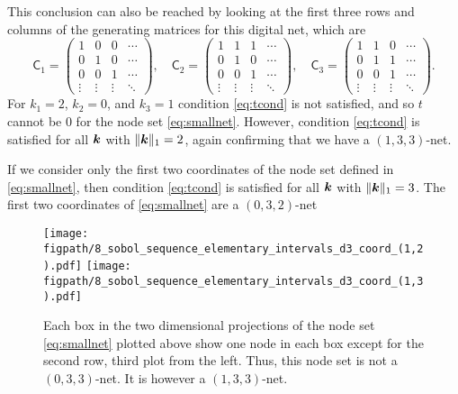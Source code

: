 \documentclass{svproc}
\newcommand{\figpath}{Figures}
\begin{document}
This conclusion can also be reached by looking at the first three rows and columns of the generating matrices for this digital net, which are
\begin{equation*}
	\mathsf{C}_1 = \begin{pmatrix}
		1 & 0 & 0 & \cdots \\ 0 & 1 & 0 & \cdots \\ 0 & 0 & 1 & \cdots \\ \vdots & \vdots & \vdots & \ddots
	\end{pmatrix}, \quad
	\mathsf{C}_2 = \begin{pmatrix}
		1 & 1 & 1 & \cdots \\ 0 & 1 & 0 & \cdots \\ 0 & 0 & 1 & \cdots \\ \vdots & \vdots & \vdots & \ddots
	\end{pmatrix}, \quad
	\mathsf{C}_3 = \begin{pmatrix}
	1 & 1 & 0 & \cdots \\ 0 & 1 & 1 & \cdots \\ 0 & 0 & 1 & \cdots \\ \vdots & \vdots & \vdots & \ddots
\end{pmatrix}.
\end{equation*}
For $k_1=2$, $k_2 = 0$, and $k_3 = 1$ condition \eqref{eq:tcond} is not satisfied, and so $t$ cannot be $0$ for the node set  \eqref{eq:smallnet}.  However, condition \eqref{eq:tcond} is satisfied for all ${\boldsymbol{k}}$ with $\lVert {\boldsymbol{k}} \rVert_1 = 2$, again confirming that we have a $(1,3,3)$-net.

If we consider only the first two coordinates of the node set defined in \eqref{eq:smallnet}, then  condition \eqref{eq:tcond} is satisfied for all ${\boldsymbol{k}}$ with $\lVert {\boldsymbol{k}} \rVert_1 = 3$.  The first two coordinates of \eqref{eq:smallnet} are a $(0,3,2)$-net



\begin{figure}
	\centering
	\texttt{[image: \\figpath/8\_sobol\_sequence\_elementary\_intervals\_d3\_coord\_(1,2).pdf]}
	\texttt{[image: \\figpath/8\_sobol\_sequence\_elementary\_intervals\_d3\_coord\_(1,3).pdf]}
	\caption{Each box in the two dimensional projections of the node set \eqref{eq:smallnet} plotted above show one node in each box except for the second row, third plot from the left.  Thus, this node set is not a $(0,3,3)$-net.  It is however a $(1,3,3)$-net.  \label{fig:elementinterval}}
\end{figure}
\end{document}
